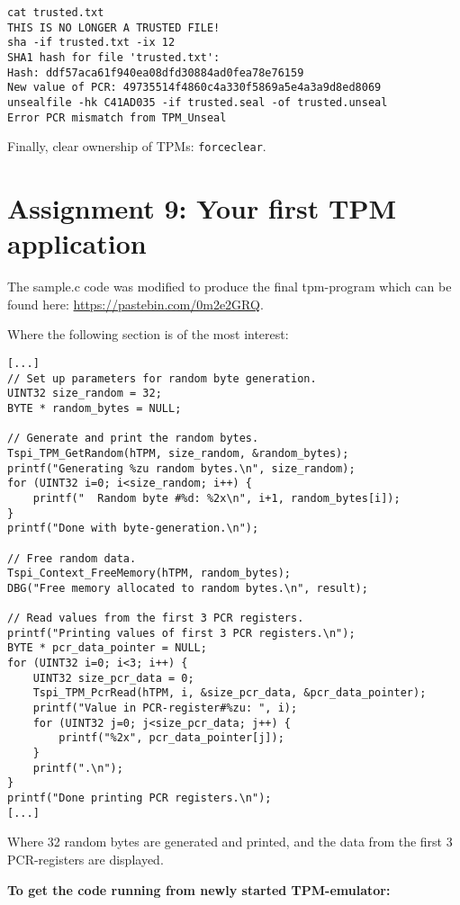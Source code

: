 \documentclass[10pt]{article}
\newcommand{\command}[1]{\texttt{#1}}
\begin{document}
\begin{verbatim}
cat trusted.txt
THIS IS NO LONGER A TRUSTED FILE!
sha -if trusted.txt -ix 12
SHA1 hash for file 'trusted.txt':
Hash: ddf57aca61f940ea08dfd30884ad0fea78e76159
New value of PCR: 49735514f4860c4a330f5869a5e4a3a9d8ed8069
unsealfile -hk C41AD035 -if trusted.seal -of trusted.unseal
Error PCR mismatch from TPM_Unseal
\end{verbatim}

Finally, clear ownership of TPMs: \command{forceclear}.

\section{Assignment 9: Your first TPM application}

The sample.c code was modified to produce the final tpm-program which can be
found here: \url{https://pastebin.com/0m2e2GRQ}.

Where the following section is of the most interest:

\begin{lstlisting}
[...]
// Set up parameters for random byte generation.
UINT32 size_random = 32;
BYTE * random_bytes = NULL;

// Generate and print the random bytes.
Tspi_TPM_GetRandom(hTPM, size_random, &random_bytes);
printf("Generating %zu random bytes.\n", size_random);
for (UINT32 i=0; i<size_random; i++) {
    printf("  Random byte #%d: %2x\n", i+1, random_bytes[i]);
}
printf("Done with byte-generation.\n");

// Free random data.
Tspi_Context_FreeMemory(hTPM, random_bytes);
DBG("Free memory allocated to random bytes.\n", result);

// Read values from the first 3 PCR registers.
printf("Printing values of first 3 PCR registers.\n");
BYTE * pcr_data_pointer = NULL;
for (UINT32 i=0; i<3; i++) {
    UINT32 size_pcr_data = 0;
    Tspi_TPM_PcrRead(hTPM, i, &size_pcr_data, &pcr_data_pointer);
    printf("Value in PCR-register#%zu: ", i);
    for (UINT32 j=0; j<size_pcr_data; j++) {
        printf("%2x", pcr_data_pointer[j]);
    }
    printf(".\n");
}
printf("Done printing PCR registers.\n");
[...]
\end{lstlisting}

Where 32 random bytes are generated and printed, and the data from the first 3 PCR-registers
are displayed.

\textbf{To get the code running from newly started TPM-emulator:}
\end{document}
